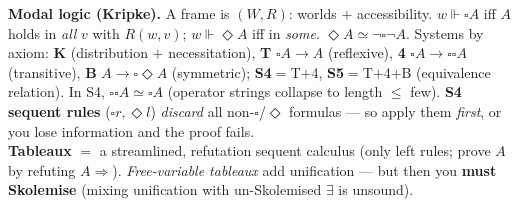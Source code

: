 \documentclass[11pt,a4paper]{article}
\newcommand{\seq}{\Rightarrow}
\newcommand{\imp}{\rightarrow}
\newcommand{\eq}{\simeq}
\begin{document}
\begin{useful}
\textbf{Modal logic (Kripke).} A frame is $(W,R)$: worlds $+$ accessibility. $w\Vdash\square A$ iff $A$ holds in \emph{all} $v$ with $R(w,v)$; $w\Vdash\Diamond A$ iff in \emph{some}. $\Diamond A\eq\neg\square\neg A$. Systems by axiom: \textbf{K} (distribution $+$ necessitation), \textbf{T} $\square A\imp A$ (reflexive), \textbf{4} $\square A\imp\square\square A$ (transitive), \textbf{B} $A\imp\square\Diamond A$ (symmetric); \textbf{S4}$=$T$+$4, \textbf{S5}$=$T$+$4$+$B (equivalence relation). In S4, $\square\square A\eq\square A$ (operator strings collapse to length $\le$ few). \textbf{S4 sequent rules} ($\square r,\Diamond l$) \emph{discard} all non-$\square$/$\Diamond$ formulas --- so apply them \emph{first}, or you lose information and the proof fails.\\[3pt]
\textbf{Tableaux} $=$ a streamlined, refutation sequent calculus (only left rules; prove $A$ by refuting $A\seq$). \emph{Free-variable tableaux} add unification --- but then you \textbf{must Skolemise} (mixing unification with un-Skolemised $\exists$ is unsound).
\end{useful}

\newpage
\end{document}
